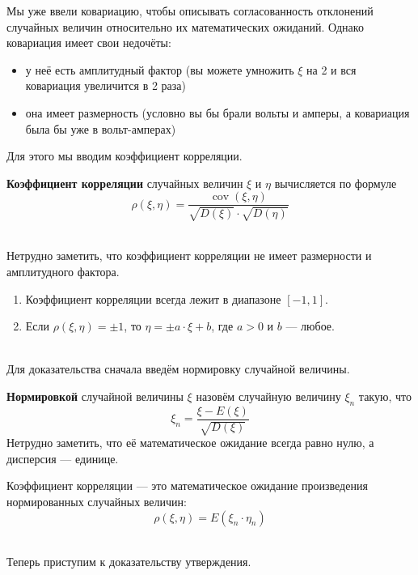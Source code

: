 \documentclass[11pt]{article}
\DeclareMathOperator{\Cov}{cov}
\begin{document}
Мы уже ввели ковариацию, чтобы описывать согласованность отклонений случайных величин относительно их математических ожиданий. 
Однако ковариация имеет свои недочёты:
\begin{itemize}
    \item у неё есть амплитудный фактор (вы можете умножить $\xi$ на 2 и вся ковариация увеличится в 2 раза)
    \item она имеет размерность (условно вы бы брали вольты и амперы, а ковариация была бы уже в вольт-амперах)
\end{itemize}
Для этого мы вводим коэффициент корреляции.
\begin{definition}
    \textbf{Коэффициент корреляции} случайных величин $\xi$ и $\eta$ вычисляется по формуле
    \[\rho(\xi, \eta) = \frac{\Cov(\xi, \eta)}{\sqrt{D(\xi)} \cdot \sqrt{D(\eta)}}\]
\end{definition} \leavevmode
\\
Нетрудно заметить, что коэффициент корреляции не имеет размерности и амплитудного фактора.
\begin{statement}
    \begin{enumerate}
        \item Коэффициент корреляции всегда лежит в диапазоне $[-1, 1]$.
        \item Если $\rho(\xi, \eta) = \pm 1$, то $\eta = \pm a \cdot \xi + b$, где $a > 0$ и $b$ --- любое.
    \end{enumerate}
\end{statement} \leavevmode
\\
Для доказательства сначала введём нормировку случайной величины.
\begin{definition}
    \textbf{Нормировкой} случайной величины $\xi$ назовём случайную величину $\xi_n$ такую, что 
    \[\xi_n = \frac{\xi - E(\xi)}{\sqrt{D(\xi)}}\]
    Нетрудно заметить, что её математическое ожидание всегда равно нулю, а дисперсия --- единице.
\end{definition}
\begin{remark}
    Коэффициент корреляции --- это математическое ожидание произведения нормированных случайных величин:
    \[\rho(\xi, \eta) = E(\xi_n \cdot \eta_n)\]
\end{remark} \leavevmode
\\
Теперь приступим к доказательству утверждения.
\end{document}
